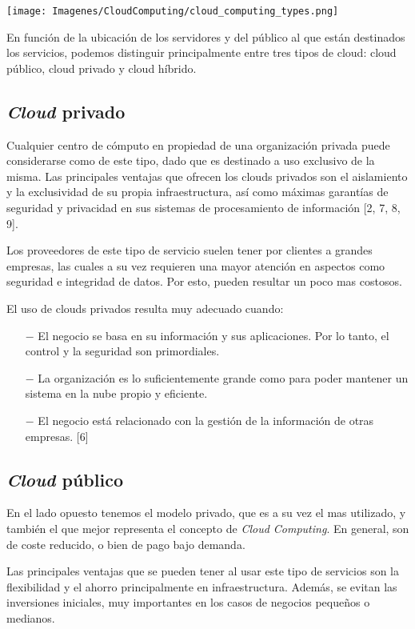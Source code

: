 \texttt{[image: Imagenes/CloudComputing/cloud\_computing\_types.png]}

En funci\'on de la ubicaci\'on de los servidores y del p\'ublico al que est\'an destinados los servicios, podemos distinguir principalmente entre tres tipos de cloud: cloud p\'ublico, cloud privado y cloud h\'ibrido.


\subsection{\textit{Cloud} privado}

Cualquier centro de c\'omputo en propiedad de una organizaci\'on privada puede considerarse como de este tipo, dado que es destinado a uso exclusivo de la misma. Las principales ventajas que ofrecen los clouds privados son el aislamiento y la exclusividad de su propia infraestructura, as\'i como m\'aximas garant\'ias de seguridad y privacidad en sus sistemas de procesamiento de informaci\'on [2, 7, 8, 9].

Los proveedores de este tipo de servicio suelen tener por clientes a grandes empresas, las cuales a su vez requieren una mayor atenci\'on en aspectos como seguridad e integridad de datos. Por esto, pueden resultar un poco mas costosos.

El uso de clouds privados resulta muy adecuado cuando:
\begin{itemize}
\item[$-$] El negocio se basa en su informaci\'on y sus aplicaciones. Por lo tanto, el control y la seguridad son primordiales.
\item[$-$] La organizaci\'on es lo suficientemente grande como para poder mantener un sistema en la nube propio y eficiente.
\item[$-$] El negocio est\'a relacionado con la gesti\'on de la informaci\'on de otras empresas. [6]
\end{itemize}

\subsection{\textit{Cloud} p\'ublico}

En el lado opuesto tenemos el modelo privado, que es a su vez el mas utilizado, y tambi\'en el que mejor representa el concepto de \textit{Cloud Computing}. En general, son de coste reducido, o bien de pago bajo demanda.

Las principales ventajas que se pueden tener al usar este tipo de servicios son la flexibilidad y el ahorro principalmente en infraestructura. Adem\'as, se evitan las inversiones iniciales, muy importantes en los casos de negocios peque\~nos o medianos.

